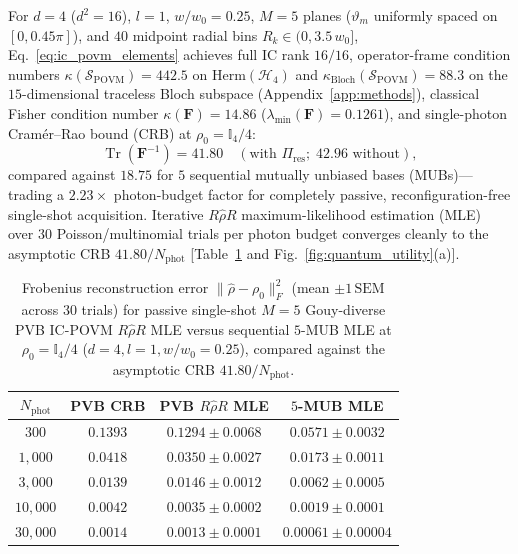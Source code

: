 \documentclass[aps,pra,reprint,nofootinbib,floatfix,longbibliography]{revtex4-2}
\newcommand{\norm}[1]{\lVert #1 \rVert}
\begin{document}
For $d = 4$ ($d^2 = 16$), $l = 1$, $w/w_0 = 0.25$, $M = 5$ planes ($\vartheta_m$ uniformly spaced on $[0, 0.45\pi]$), and $40$ midpoint radial bins $R_k \in (0, 3.5\,w_0]$, Eq.~\eqref{eq:ic_povm_elements} achieves full IC rank $16/16$, operator-frame condition numbers $\kappa(\mathcal{S}_{\mathrm{POVM}}) = 442.5$ on $\mathrm{Herm}(\mathcal{H}_4)$ and $\kappa_{\mathrm{Bloch}}(\mathcal{S}_{\mathrm{POVM}}) = 88.3$ on the $15$-dimensional traceless Bloch subspace (Appendix~\ref{app:methods}), classical Fisher condition number $\kappa(\mathbf{F}) = 14.86$ ($\lambda_{\min}(\mathbf{F}) = 0.1261$), and single-photon Cram\'er--Rao bound (CRB) at $\rho_0 = \mathbb{I}_4/4$:
\begin{equation}
\operatorname{Tr}\!\left(\mathbf{F}^{-1}\right) = 41.80 \quad (\text{with }\Pi_{\mathrm{res}};\; 42.96\text{ without}),
\label{eq:fisher_crb}
\end{equation}
compared against $18.75$ for $5$ sequential mutually unbiased bases (MUBs)---trading a $2.23\times$ photon-budget factor for completely passive, reconfiguration-free single-shot acquisition. Iterative $R\hat{\rho}R$ maximum-likelihood estimation (MLE)~\cite{Lvovsky2004} over $30$ Poisson/multinomial trials per photon budget converges cleanly to the asymptotic CRB $41.80/N_{\mathrm{phot}}$ [Table~\ref{tab:povm_mle} and Fig.~\ref{fig:quantum_utility}(a)].

\begin{table}[t]
\caption{Frobenius reconstruction error $\norm{\hat{\rho} - \rho_0}_F^2$ (mean $\pm 1\,\mathrm{SEM}$ across $30$ trials) for passive single-shot $M = 5$ Gouy-diverse PVB IC-POVM $R\hat{\rho}R$ MLE versus sequential $5$-MUB MLE at $\rho_0 = \mathbb{I}_4/4$ ($d = 4, l = 1, w/w_0 = 0.25$), compared against the asymptotic CRB $41.80/N_{\mathrm{phot}}$.}
\label{tab:povm_mle}
\begin{ruledtabular}
\setlength{\tabcolsep}{4pt}
\begin{tabular}{cccc}
$N_{\mathrm{phot}}$ & PVB CRB & PVB $R\hat{\rho}R$ MLE & $5$-MUB MLE \\
\hline
$300$ & $0.1393$ & $0.1294\pm 0.0068$ & $0.0571\pm 0.0032$ \\
$1{,}000$ & $0.0418$ & $0.0350\pm 0.0027$ & $0.0173\pm 0.0011$ \\
$3{,}000$ & $0.0139$ & $0.0146\pm 0.0012$ & $0.0062\pm 0.0005$ \\
$10{,}000$ & $0.0042$ & $0.0035\pm 0.0002$ & $0.0019\pm 0.0001$ \\
$30{,}000$ & $0.0014$ & $0.0013\pm 0.0001$ & $0.00061\pm 0.00004$ \\
\end{tabular}
\end{ruledtabular}
\end{table}
\end{document}
